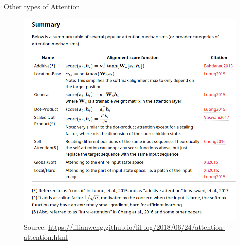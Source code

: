\documentclass[handout]{beamer}
\begin{document}
\begin{frame}{Other types of Attention}
\begin{scriptsize}

       \begin{figure}[h]
        	\includegraphics[scale = 0.32]{pics/types_of_attention.png}
        	\caption{Source: \url{https://lilianweng.github.io/lil-log/2018/06/24/attention-attention.html}}
        \end{figure}  


\end{scriptsize}
\end{frame}
\end{document}
